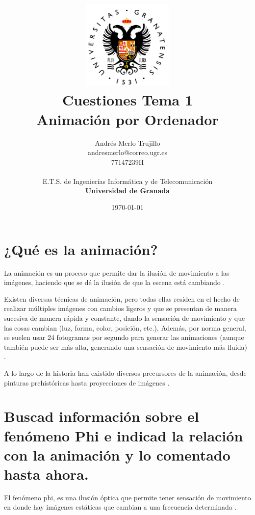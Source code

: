 \documentclass{article}
\title{
\includegraphics[width=1.75in]{imagenes/UGR-Logo.png} \\
\vspace*{1in}
\textbf{Cuestiones Tema 1} \\
Animación por Ordenador \\
\vspace*{0.5in}}
\author{Andrés Merlo Trujillo \\
andresmerlo@correo.ugr.es \\
77147239H \\ 
\vspace*{0.5in} \\
E.T.S. de Ingenierías Informática y de Telecomunicación \\
\textbf{Universidad de Granada}} \date{\today}
\begin{document}
\begin{titlingpage}
\maketitle
\end{titlingpage}

\tableofcontents

\newpage

\pagestyle{fancy}   %

\section{¿Qué es la animación?}

La animación es un proceso que permite dar la ilusión de movimiento a las imágenes, haciendo que se dé la ilusión de que la escena está cambiando \cite{anim}.

\bigskip

Existen diversas técnicas de animación, pero todas ellas residen en el hecho de realizar múltiples imágenes con cambios ligeros y que se presentan de manera sucesiva de manera rápida y constante, dando la sensación de movimiento y que las cosas cambian (luz, forma, color, posición, etc.). Además, por norma general, se suelen usar 24 fotogramas por segundo para generar las animaciones (aunque también puede ser más alta, generando una sensación de movimiento más fluida) \cite{trans}.

\bigskip

A lo largo de la historia han existido diversos precursores de la animación, desde pinturas prehistóricas hasta proyecciones de imágenes \cite{trans}.

\section{Buscad información sobre el fenómeno Phi e indicad la relación con la animación y lo comentado hasta ahora.}

El fenómeno phi, es una ilusión óptica que permite tener sensación de movimiento en donde hay imágenes estáticas que cambian a una frecuencia determinada \cite{wikiphi}.
\end{document}
